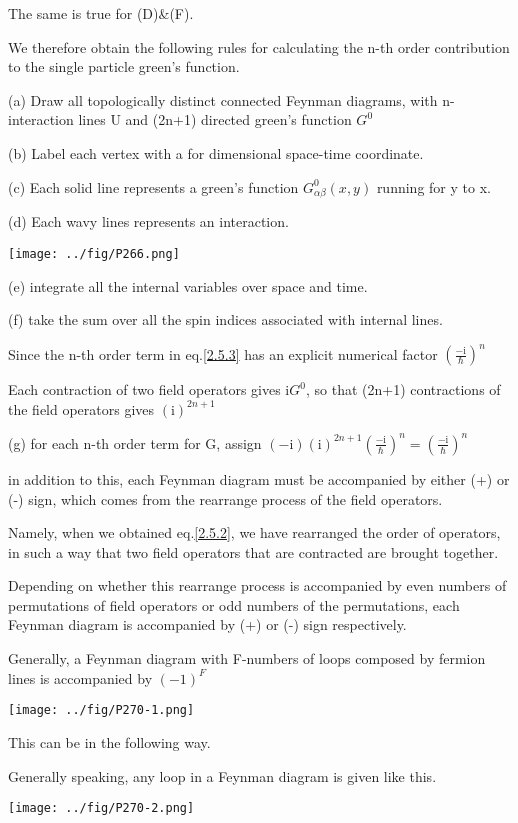 The same is true for (D)\&(F).

We therefore obtain the following rules for calculating the n-th order contribution to the single particle green's function.

(a) Draw all topologically distinct connected Feynman diagrams, with n-interaction lines U and (2n+1) directed green's function $G^0$

(b) Label each vertex with a for dimensional space-time coordinate.

(c) Each solid line represents a green's function $G_{\alpha\beta}^0(x,y)$ running for y to x.

(d) Each wavy lines represents an interaction.
\begin{center}
\texttt{[image: ../fig/P266.png]}
\end{center}
(e) integrate all the internal variables over space and time.

(f) take the sum over all the spin indices associated with internal lines.

Since the n-th order term in eq.\eqref{2.5.3} has an explicit numerical factor $(\frac{-\mathrm{i}}{\hbar})^n$

Each contraction of two field operators gives $\mathrm{i}G^0$, so that (2n+1) contractions of the field operators gives $(\mathrm{i})^{2n+1}$

(g) for each n-th order term for G, assign $(-\mathrm{i})(\mathrm{i})^{2n+1}(\frac{-\mathrm{i}}{\hbar})^n=(\frac{-\mathrm{i}}{\hbar})^n$

in addition to this, each Feynman diagram must be accompanied by  either (+) or (-) sign, which comes from the rearrange process of the field operators.

Namely, when we obtained eq.\eqref{2.5.2}, we have rearranged the order of operators, in such a way that two field operators that are contracted are brought together.

Depending on whether this rearrange process is accompanied by even numbers of permutations of field operators or odd numbers of the permutations, each Feynman diagram is accompanied by (+) or (-) sign respectively.

Generally, a Feynman diagram with F-numbers of loops composed by fermion lines is accompanied by $(-1)^F$
\begin{center}
\texttt{[image: ../fig/P270-1.png]}
\end{center}
This can be in the following way.

Generally speaking, any loop in a Feynman diagram is given like this.
\begin{center}
\texttt{[image: ../fig/P270-2.png]}
\end{center}

